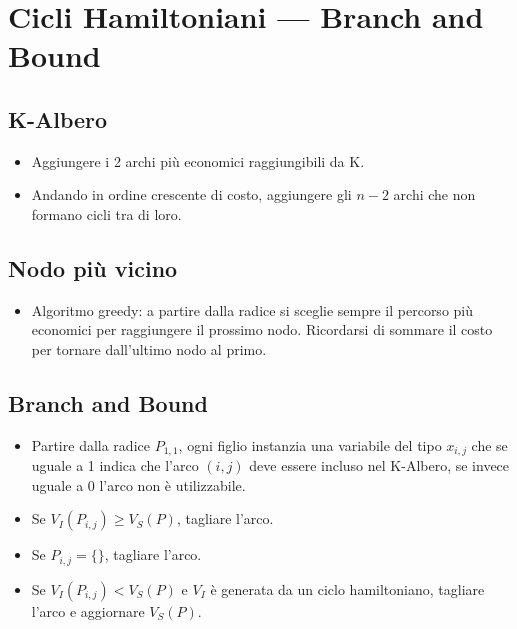 \documentclass[9pt]{extarticle}
\begin{document}
\begin{multicols}{2}
\begin{itemize}
\end{itemize}

\section{Cicli Hamiltoniani --- Branch and Bound}
\subsection{K-Albero}
\begin{itemize}
    \setlength{\itemsep}{-3pt}
    \item Aggiungere i 2 archi più economici raggiungibili da K.
    \item Andando in ordine crescente di costo, aggiungere gli $n-2$ archi che
        non formano cicli tra di loro.
\end{itemize}
\subsection{Nodo più vicino}
\begin{itemize}
    \setlength{\itemsep}{-3pt}
    \item Algoritmo greedy: a partire dalla radice si sceglie sempre il
        percorso più economici per raggiungere il prossimo nodo.
        Ricordarsi di sommare il costo per tornare dall'ultimo nodo al primo.
\end{itemize}
\subsection{Branch and Bound}
\begin{itemize}
    \setlength{\itemsep}{-3pt}
    \item Partire dalla radice $P_{1,1}$, ogni figlio instanzia una variabile
        del tipo $x_{i,j}$ che se uguale a 1 indica che l'arco $(i,j)$ deve
        essere incluso nel K-Albero, se invece uguale a 0 l'arco non è
        utilizzabile.
    \item Se $V_I(P_{i,j}) \ge V_S(P)$, tagliare l'arco.
    \item Se $P_{i,j} = \{\}$, tagliare l'arco.
    \item Se $V_I(P_{i,j}) < V_S(P)$ e $V_I$ è generata da un ciclo
        hamiltoniano, tagliare l'arco e aggiornare $V_S(P)$.
\end{itemize}

\end{multicols}
\end{document}
